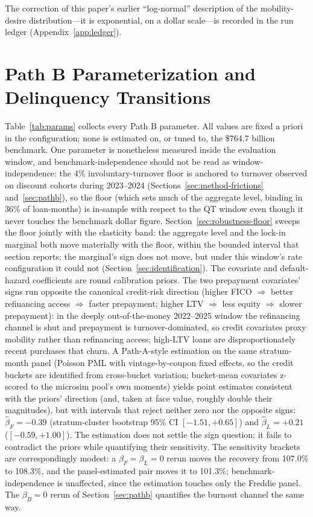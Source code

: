 \documentclass[12pt]{article}
\begin{document}
The correction of this paper's earlier ``log-normal'' description of the mobility-desire distribution---it is exponential, on a dollar scale---is recorded in the run ledger (Appendix~\ref{app:ledger}).

\section{Path B Parameterization and Delinquency Transitions}\label{app:params}

Table~\ref{tab:params} collects every Path B parameter. All values are fixed a priori in the configuration; none is estimated on, or tuned to, the \$764.7 billion benchmark. One parameter is nonetheless measured inside the evaluation window, and benchmark-independence should not be read as window-independence: the 4\% involuntary-turnover floor is anchored to turnover observed on discount cohorts during 2023--2024 (Sections~\ref{sec:method-frictions} and~\ref{sec:pathb}), so the floor (which sets much of the aggregate level, binding in 36\% of loan-months) is in-sample with respect to the QT window even though it never touches the benchmark dollar figure. Section~\ref{sec:robustness-floor} sweeps the floor jointly with the elasticity band: the aggregate level and the lock-in marginal both move materially with the floor, within the bounded interval that section reports; the marginal's sign does not move, but under this window's rate configuration it could not (Section~\ref{sec:identification}). The covariate and default-hazard coefficients are round calibration priors. The two prepayment covariates' signs run opposite the canonical credit-risk direction (higher FICO $\Rightarrow$ better refinancing access $\Rightarrow$ faster prepayment; higher LTV $\Rightarrow$ less equity $\Rightarrow$ slower prepayment): in the deeply out-of-the-money 2022--2025 window the refinancing channel is shut and prepayment is turnover-dominated, so credit covariates proxy mobility rather than refinancing access; high-LTV loans are disproportionately recent purchases that churn. A Path-A-style estimation on the same stratum-month panel (Poisson PML with vintage-by-coupon fixed effects, so the credit buckets are identified from cross-bucket variation; bucket-mean covariates z-scored to the microsim pool's own moments) yields point estimates consistent with the priors' direction (and, taken at face value, roughly double their magnitudes), but with intervals that reject neither zero nor the opposite signs: $\hat{\beta}_F = -0.39$ (stratum-cluster bootstrap 95\% CI $[-1.51, +0.65]$) and $\hat{\beta}_L = +0.21$ ($[-0.59, +1.00]$). The estimation does not settle the sign question; it fails to contradict the priors while quantifying their sensitivity. The sensitivity brackets are correspondingly modest: a $\beta_F = \beta_L = 0$ rerun moves the recovery from 107.0\% to 108.3\%, and the panel-estimated pair moves it to 101.3\%; benchmark-independence is unaffected, since the estimation touches only the Freddie panel. The $\beta_B = 0$ rerun of Section~\ref{sec:pathb} quantifies the burnout channel the same way.
\end{document}
